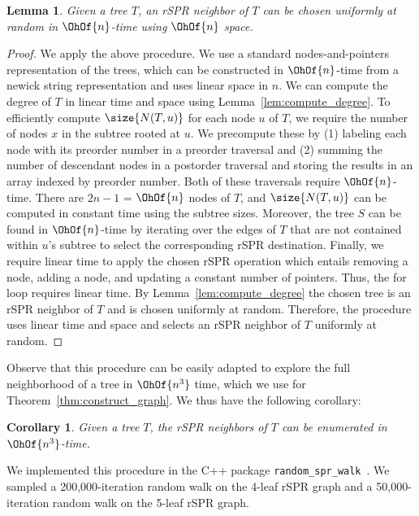 \documentclass[11pt,onecolumn,conference]{IEEEtran}
\newtheorem{lemma}[theorem]{Lemma}
\newtheorem{corollary}[theorem]{Corollary}
\begin{document}
\begin{lemma}
	\label{lem:select_random_neighbor}
	Given a tree $T$, an rSPR neighbor of $T$ can be chosen uniformly at random in $\OhOf{n}$-time using $\OhOf{n}$ space.
\end{lemma}
\begin{proof}
	We apply the above procedure.
	We use a standard nodes-and-pointers representation of the trees, which can be constructed in $\OhOf{n}$-time from a newick string representation and uses linear space in $n$.
	We can compute the degree of $T$ in linear time and space using Lemma~\ref{lem:compute_degree}.
	To efficiently compute $\size{N(T,u)}$ for each node $u$ of $T$, we require the number of nodes $x$ in the subtree rooted at $u$.
	We precompute these by (1) labeling each node with its preorder number in a preorder traversal and (2) summing the number of descendant nodes in a postorder traversal and storing the results in an array indexed by preorder number.
	Both of these traversals require $\OhOf{n}$-time.
	There are $2n-1$ = $\OhOf{n}$ nodes of $T$, and $\size{N(T,u)}$ can be computed in constant time using the subtree sizes.
	Moreover, the tree $S$ can be found in $\OhOf{n}$-time by iterating over the edges of $T$ that are not contained within $u$'s subtree to select the corresponding rSPR destination.
	Finally, we require linear time to apply the chosen rSPR operation which entails removing a node, adding a node, and updating a constant number of pointers.
	Thus, the for loop requires linear time.
	By Lemma~\ref{lem:compute_degree} the chosen tree is an rSPR neighbor of $T$ and is chosen uniformly at random.
	Therefore, the procedure uses linear time and space and selects an rSPR neighbor of $T$ uniformly at random.
\end{proof}

Observe that this procedure can be easily adapted to explore the full neighborhood of a tree in $\OhOf{n^3}$ time, which we use for Theorem~\ref{thm:construct_graph}.
We thus have the following corollary:

\begin{corollary}
	Given a tree $T$, the rSPR neighbors of $T$ can be enumerated in $\OhOf{n^3}$-time.
\end{corollary}

We implemented this procedure in the C++ package \texttt{random\_spr\_walk}~\cite{random_spr_walk}.
We sampled a 200,000-iteration random walk on the 4-leaf rSPR graph and a 50,000-iteration random walk on the 5-leaf rSPR graph.
\end{document}
